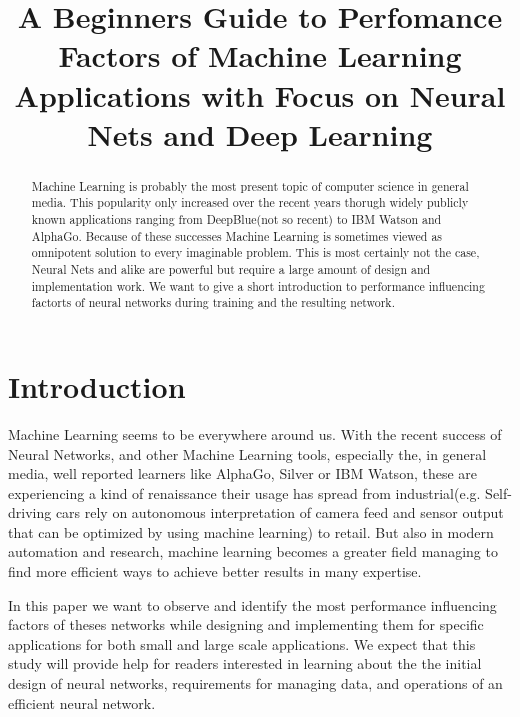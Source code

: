 \documentclass[conference]{IEEEtran}
\begin{document}
\title{
A Beginners Guide to Perfomance Factors of Machine Learning Applications with Focus on Neural Nets and Deep Learning
}

\author{
}

\maketitle

\begin{abstract}

Machine Learning is probably the most present topic of computer science in general media. This popularity only increased over the recent years thorugh widely publicly known applications ranging from DeepBlue(not so recent) to IBM Watson and AlphaGo. Because of these successes Machine Learning is sometimes viewed as omnipotent solution to every imaginable problem. This is most certainly not the case, Neural Nets and alike are powerful but require a large amount of design and implementation work. We want to give a short introduction to performance influencing factorts of neural networks during training and the resulting network.

\end{abstract}

\IEEEpeerreviewmaketitle
\section{Introduction}
Machine Learning seems to be everywhere around us. With the recent success of Neural Networks, and other Machine Learning tools, especially the, in general media, well reported learners like AlphaGo, Silver or IBM Watson, these are experiencing a kind of renaissance their usage has spread from industrial(e.g. Self-driving cars rely on autonomous interpretation of camera feed and sensor output that can be optimized by using machine learning) to retail. But also in modern automation and research, machine learning becomes a greater field managing to find more efficient ways to achieve better results in many expertise.

In this paper we want to observe and identify the most performance influencing factors of theses networks while designing and implementing them for specific applications for both small and large scale applications.
We expect that this study will provide help for readers interested in learning about the the initial design of neural networks, requirements for managing data, and operations of an efficient neural network.
\end{document}
